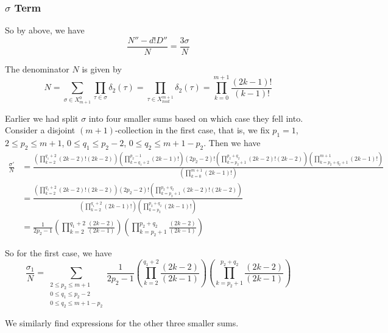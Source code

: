 \documentclass[11pt]{article}
\theoremstyle{definition}
\theoremstyle{definition}
\theoremstyle{plain}
\theoremstyle{plain}
\theoremstyle{plain}
\theoremstyle{definition}
\begin{document}
\subsubsection*{$\sigma$ Term}

So by above, we have
\begin{equation*}
\frac{N''-d!D''}{N} = \frac{3\sigma}{N}
\end{equation*}

The denominator $N$ is given by
\begin{equation*}
N = \sum\limits_{\sigma \in X^0_{m+1}}\prod\limits_{\tau\in\sigma}\delta_2(\tau) = \prod\limits_{\tau \in X^{m+1}_\text{roof}}\delta_2(\tau) = \prod\limits_{k=0}^{m+1}\frac{(2k-1)!}{(k-1)!}
\end{equation*}

Earlier we had split $\sigma$ into four smaller sums based on which case they fell into. Consider a disjoint $(m+1)$-collection in the first case, that is, we fix $p_1 = 1$, $2\leq p_2\leq m+1$, $0\leq q_1\leq p_2 - 2$, $0\leq q_2 \leq m+1-p_2$. Then we have
\begin{align*}
\frac{\sigma'}{N} &= \frac{\left(\prod\limits_{k=2}^{q_1+2}(2k-2)!(2k-2)\right)\left(\prod\limits_{k=q_1+2}^{p_2-1}(2k-1)!\right)(2p_2-2)!\left(\prod\limits_{k=p_2+1}^{p_2+q_2}(2k-2)!(2k-2)\right)\left(\prod\limits_{k=p_2+q_2+1}^{m+1}(2k-1)!\right)}{\left(\prod\limits_{k=0}^{m+1}(2k-1)!\right)} \\
&= \frac{\left(\prod\limits_{k=2}^{q_1+2}(2k-2)!(2k-2)\right)(2p_2-2)!\left(\prod\limits_{k=p_2+1}^{p_2+q_2}(2k-2)!(2k-2)\right)}{\left(\prod\limits_{k=2}^{q_1+2}(2k-1)!\right)\left(\prod\limits_{k=p_2}^{p_2+q_2}(2k-1)!\right)} \\
&= \frac{1}{2p_2-1}\left(\prod\limits_{k=2}^{q_1+2}\frac{(2k-2)}{(2k-1)}\right)\left(\prod\limits_{k=p_2+1}^{p_2+q_2}\frac{(2k-2)}{(2k-1)}\right)
\end{align*}

So for the first case, we have
\begin{equation*}
\frac{\sigma_1}{N} = \sum\limits_{\substack{2\leq p_2\leq m+1 \\ 0\leq q_1 \leq p_2-2 \\ 0\leq q_2 \leq m+1-p_2}}\frac{1}{2p_2-1}\left(\prod\limits_{k=2}^{q_1+2}\frac{(2k-2)}{(2k-1)}\right)\left(\prod\limits_{k=p_2+1}^{p_2+q_2}\frac{(2k-2)}{(2k-1)}\right)
\end{equation*}

We similarly find expressions for the other three smaller sums.
\end{document}
